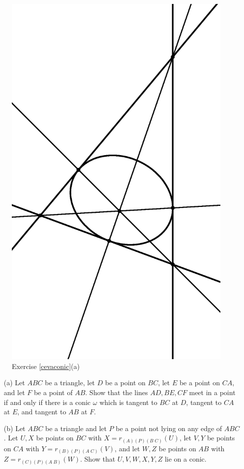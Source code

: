 \begin{figure}[!htb]
\centering
\includegraphics[scale=0.3,angle=270]{cevaconic.eps}
\caption{Exercise \ref{cevaconic}(a)}
\end{figure}

\begin{exer}\label{cevaconic}\hspace{2em}
\begin{itemize}
\item[(a)] Let $ABC$ be a triangle, let $D$ be a point on $BC$, let $E$ be a point on $CA$, and let $F$ be a point of $AB$. Show that the lines $AD,BE,CF$ meet in a point if and only if there is a conic $\omega$ which is tangent to $BC$ at $D$, tangent to $CA$ at $E$, and tangent to $AB$ at $F$.
\item[(b)] Let $ABC$ be a triangle and let $P$ be a point not lying on any edge of $ABC$. Let $U,X$ be points on $BC$ with $X = r_{(A)(P)(B\;C)}(U)$, let $V,Y$ be points on $CA$ with $Y = r_{(B)(P)(A\;C)}(V)$, and let $W,Z$ be points on $AB$ with $Z = r_{(C)(P)(A\;B)}(W)$. Show that $U,V,W,X,Y,Z$ lie on a conic.
\end{itemize}
\end{exer}

